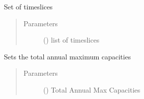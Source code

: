 \documentclass[a4paper,12pt,english]{article}
\begin{document}
\begin{fulllineitems}
\begin{fulllineitems}
\begin{quote}
\begin{description}
\end{description}\end{quote}

\end{fulllineitems}


\begin{fulllineitems}
\label{\detokenize{GOCPI:GOCPI.CreateCases.CreateCases.set_timeslice}}
Set of timeslices
\begin{quote}\begin{description}
\item[{Parameters}] \leavevmode
{} () \textendash{} list of timeslices

\end{description}\end{quote}

\end{fulllineitems}


\begin{fulllineitems}
\label{\detokenize{GOCPI:GOCPI.CreateCases.CreateCases.set_total_annual_max_capacity}}
Sets the total annual maximum capacities
\begin{quote}\begin{description}
\item[{Parameters}] \leavevmode
{} (\sphinxstyleliteralemphasis{\sphinxupquote{, }}) \textendash{} Total Annual Max Capacities

\end{description}\end{quote}

\end{fulllineitems}


\end{fulllineitems}
\end{document}
